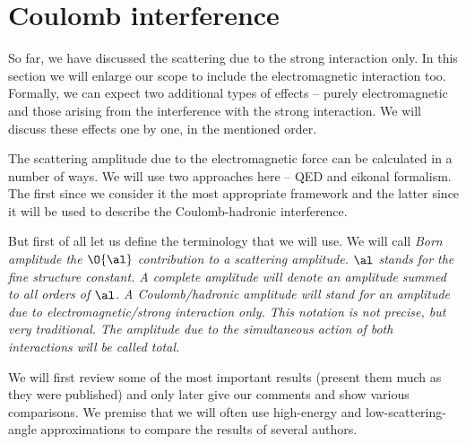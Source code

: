 \section[el coulomb]{Coulomb interference}

So far, we have discussed the scattering due to the strong interaction only. In this section we will enlarge our scope to include the electromagnetic interaction too. Formally, we can expect two additional types of effects -- purely electromagnetic and those arising from the interference with the strong interaction. We will discuss these effects one by one, in the mentioned order.

The scattering amplitude due to the electromagnetic force can be calculated in a number of ways. We will use two approaches here -- QED and eikonal formalism. The first since we consider it the most appropriate framework and the latter since it will be used to describe the Coulomb-hadronic interference.

But first of all let us define the terminology that we will use. We will call \em{Born amplitude} the $\O{\al}$ contribution to a scattering amplitude. $\al$ stands for the fine structure constant. A \em{complete} amplitude will denote an amplitude summed to all orders of $\al$. A \em{Coulomb}/\em{hadronic} amplitude will stand for an amplitude due to electromagnetic/strong interaction only. This notation is not precise, but very traditional. The amplitude due to the simultaneous action of both interactions will be called \em{total}.

We will first review some of the most important results (present them much as they were published) and only later give our comments and show various comparisons. We premise that we will often use high-energy and low-scattering-angle approximations to compare the results of several authors.



